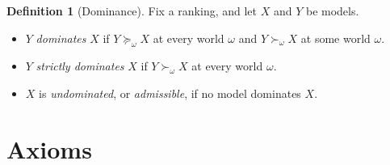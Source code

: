 \documentclass[11pt]{article}
\theoremstyle{plain}
\theoremstyle{definition}
\newtheorem{definition}[theorem]{Definition}
\begin{document}
\begin{definition}[Dominance]\label{def:dominance}
Fix a ranking, and let $X$ and $Y$ be models.
\begin{itemize}
  \item $Y$ \emph{dominates} $X$ if $Y\succeq_\omega X$ at every world $\omega$ and
  $Y\succ_\omega X$ at some world $\omega$.
  \item $Y$ \emph{strictly dominates} $X$ if $Y\succ_\omega X$ at every world $\omega$.
  \item $X$ is \emph{undominated}, or \emph{admissible}, if no model dominates $X$.
\end{itemize}
\end{definition}

\section{Axioms}\label{sec:axioms}
\end{document}
